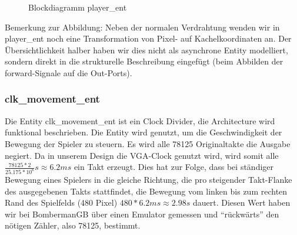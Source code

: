\documentclass[parskip=full]{scrartcl}
\begin{document}
				\begin{figure}[H]
					\centering
					\caption{Blockdiagramm player\_ent}
				\end{figure}
				
				Bemerkung zur Abbildung: Neben der normalen Verdrahtung wenden wir in player\_ent noch eine Transformation von Pixel- auf Kachelkoordinaten an. Der Übersichtlichkeit halber haben wir dies nicht als asynchrone Entity modelliert, sondern direkt in die strukturelle Beschreibung eingefügt (beim Abbilden der forward-Signale auf die Out-Ports).
				\subsubsection{clk\_movement\_ent}
				Die Entity clk\_movement\_ent ist ein Clock Divider, die Architecture wird funktional beschrieben. Die Entity wird genutzt, um die Geschwindigkeit der Bewegung der Spieler zu steuern. Es wird alle 78125 Originaltakte die Ausgabe negiert. Da in unserem Design die VGA-Clock genutzt wird, wird somit alle $\frac{78125 * 2}{25.175 * 10^6}s \approx 6.2ms$ ein Takt erzeugt. Dies hat zur Folge, dass bei ständiger Bewegung eines Spielers in die gleiche Richtung, die pro steigender Takt-Flanke des ausgegebenen Takts stattfindet, die Bewegung vom linken bis zum rechten Rand des Spielfelds (480 Pixel) $480 * 6.2 ms \approx 2.98 s$ dauert. Diesen Wert haben wir bei BombermanGB über einen Emulator gemessen und \enquote{rückwärts} den nötigen Zähler, also 78125, bestimmt.
\end{document}

